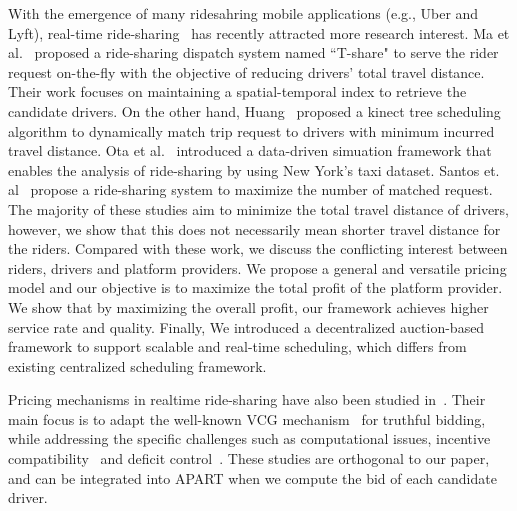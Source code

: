 With the emergence of many ridesahring mobile applications (e.g., Uber and Lyft), real-time ride-sharing~\cite{Ma13, Ma15, Huang14,Ota15, Cici15, Cao15, PelzerITS15} has recently attracted more research interest. Ma et al.~\cite{Ma13, Ma15} proposed a ride-sharing dispatch system named ``T-share" to serve the rider request on-the-fly with the objective of reducing drivers' total travel distance. Their work focuses on maintaining a spatial-temporal index to retrieve the candidate drivers. On the other hand, Huang~\cite{Huang14} proposed a kinect tree scheduling algorithm to dynamically match trip request to drivers with minimum incurred travel distance. Ota et al.~\cite{Ota15} introduced a data-driven simuation framework that enables the analysis of ride-sharing by using New York's taxi dataset. Santos et. al~\cite{SantosIjcai13} propose a ride-sharing system to maximize the number of matched request. The majority of these studies aim to minimize the total travel distance of drivers, however, we show that this does not necessarily mean shorter travel distance for the riders. Compared with these work, we discuss the conflicting interest between riders, drivers and platform providers. We propose a general and versatile pricing model and  our objective is to maximize the total profit of the platform provider. We show that by maximizing the overall profit, our framework achieves higher service rate and quality.  Finally, We introduced a decentralized auction-based framework to support scalable and real-time scheduling, which differs from existing centralized scheduling framework. 

Pricing mechanisms in realtime ride-sharing have also been studied in~\cite{KamarIJCAI09,KleinerIJCAI11, ZhaoAAMAS14}. Their main focus is to adapt the well-known VCG mechanism~\cite{Nisan07} for truthful bidding, while addressing the specific challenges such as computational issues, incentive compatibility~\cite{KamarIJCAI09, KleinerIJCAI11} and deficit control~\cite{ZhaoAAMAS14}. These studies are orthogonal to our paper, and can be integrated into APART when we compute the bid of each candidate driver. 

